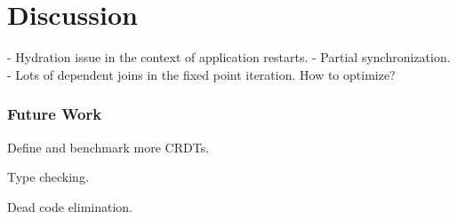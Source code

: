 
\chapter{Discussion}\label{ch:discussion}

- Hydration issue in the context of application restarts.
- Partial synchronization.
- Lots of dependent joins in the fixed point iteration. How to optimize?

\subsection{Future Work}

Define and benchmark more CRDTs.

Type checking.

Dead code elimination.
